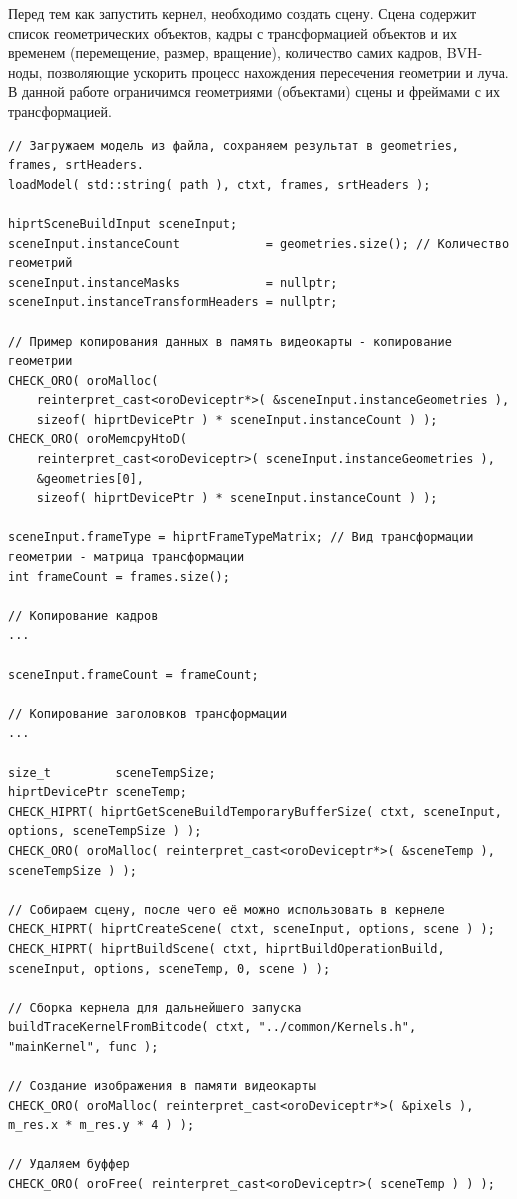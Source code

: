 \documentclass[a4paper,14pt]{extarticle}
\begin{document}
Перед тем как запустить кернел, необходимо создать сцену. 
Сцена содержит список геометрических объектов, кадры с трансформацией объектов и их временем (перемещение, размер, вращение), 
количество самих кадров, BVH-ноды, позволяющие ускорить процесс нахождения пересечения геометрии и луча. 
В данной работе ограничимся геометриями (объектами) сцены и фреймами с их трансформацией. 
\begin{verbatim}
// Загружаем модель из файла, сохраняем результат в geometries, frames, srtHeaders.
loadModel( std::string( path ), ctxt, frames, srtHeaders );

hiprtSceneBuildInput sceneInput;
sceneInput.instanceCount			= geometries.size(); // Количество геометрий
sceneInput.instanceMasks			= nullptr;
sceneInput.instanceTransformHeaders = nullptr;

// Пример копирования данных в память видеокарты - копирование геометрии
CHECK_ORO( oroMalloc(                                   
    reinterpret_cast<oroDeviceptr*>( &sceneInput.instanceGeometries ),
    sizeof( hiprtDevicePtr ) * sceneInput.instanceCount ) );
CHECK_ORO( oroMemcpyHtoD(
    reinterpret_cast<oroDeviceptr>( sceneInput.instanceGeometries ),
    &geometries[0],
    sizeof( hiprtDevicePtr ) * sceneInput.instanceCount ) );

sceneInput.frameType = hiprtFrameTypeMatrix; // Вид трансформации геометрии - матрица трансформации
int frameCount = frames.size();

// Копирование кадров
...

sceneInput.frameCount = frameCount;

// Копирование заголовков трансформации
...

size_t		   sceneTempSize;
hiprtDevicePtr sceneTemp;
CHECK_HIPRT( hiprtGetSceneBuildTemporaryBufferSize( ctxt, sceneInput, options, sceneTempSize ) );
CHECK_ORO( oroMalloc( reinterpret_cast<oroDeviceptr*>( &sceneTemp ), sceneTempSize ) );

// Собираем сцену, после чего её можно использовать в кернеле
CHECK_HIPRT( hiprtCreateScene( ctxt, sceneInput, options, scene ) );
CHECK_HIPRT( hiprtBuildScene( ctxt, hiprtBuildOperationBuild, sceneInput, options, sceneTemp, 0, scene ) );

// Сборка кернела для дальнейшего запуска
buildTraceKernelFromBitcode( ctxt, "../common/Kernels.h", "mainKernel", func );

// Создание изображения в памяти видеокарты
CHECK_ORO( oroMalloc( reinterpret_cast<oroDeviceptr*>( &pixels ), m_res.x * m_res.y * 4 ) );

// Удаляем буффер
CHECK_ORO( oroFree( reinterpret_cast<oroDeviceptr>( sceneTemp ) ) );
\end{verbatim}
\end{document}
